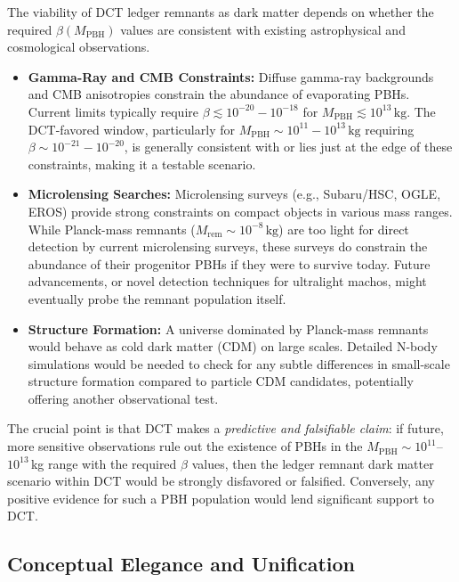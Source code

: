 \documentclass[a4paper, 12pt, oneside]{book}
\numberwithin{equation}{chapter}
\begin{document}
The viability of DCT ledger remnants as dark matter depends on whether the required $\beta(M_{\text{PBH}})$ values are consistent with existing astrophysical and cosmological observations.
\begin{itemize}
    \item \textbf{Gamma-Ray and CMB Constraints:} Diffuse gamma-ray backgrounds and CMB anisotropies constrain the abundance of evaporating PBHs. Current limits typically require $\beta \lesssim 10^{-20} - 10^{-18}$ for $M_{\text{PBH}} \lesssim 10^{13}\,\mathrm{kg}$. The DCT-favored window, particularly for $M_{\text{PBH}} \sim 10^{11}-10^{13}\,\mathrm{kg}$ requiring $\beta \sim 10^{-21}-10^{-20}$, is generally consistent with or lies just at the edge of these constraints, making it a testable scenario.
    \item \textbf{Microlensing Searches:} Microlensing surveys (e.g., Subaru/HSC, OGLE, EROS) provide strong constraints on compact objects in various mass ranges. While Planck-mass remnants ($M_{\text{rem}} \sim 10^{-8}\,\mathrm{kg}$) are too light for direct detection by current microlensing surveys, these surveys do constrain the abundance of their progenitor PBHs if they were to survive today. Future advancements, or novel detection techniques for ultralight machos, might eventually probe the remnant population itself.
    \item \textbf{Structure Formation:} A universe dominated by Planck-mass remnants would behave as cold dark matter (CDM) on large scales. Detailed N-body simulations would be needed to check for any subtle differences in small-scale structure formation compared to particle CDM candidates, potentially offering another observational test.
\end{itemize}
The crucial point is that DCT makes a \emph{predictive and falsifiable claim}: if future, more sensitive observations rule out the existence of PBHs in the \(M_{\text{PBH}}\sim10^{11}\)–\(10^{13}\)\,kg range with the required \(\beta\) values, then the ledger remnant dark matter scenario within DCT would be strongly disfavored or falsified. Conversely, any positive evidence for such a PBH population would lend significant support to DCT.

\subsection{Conceptual Elegance and Unification}
\label{ssec:DMElegance}
\end{document}
